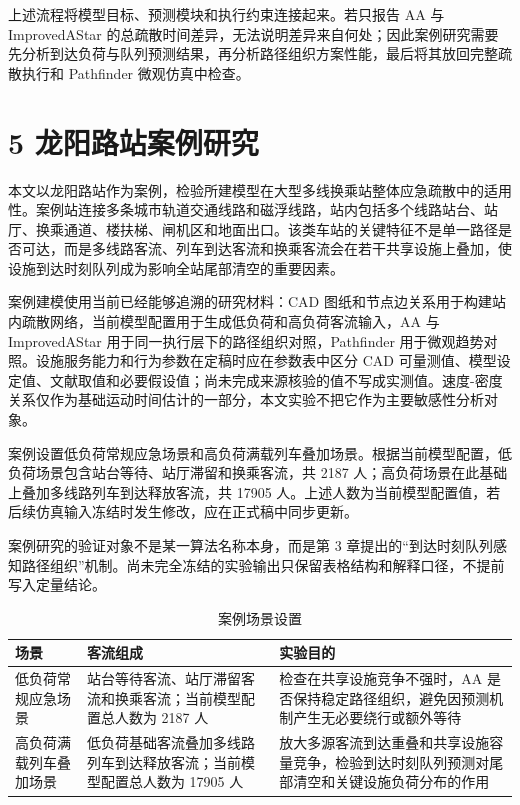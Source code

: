 \documentclass[UTF8,a4paper,12pt]{ctexart}
\begin{document}
上述流程将模型目标、预测模块和执行约束连接起来。若只报告 AA 与 ImprovedAStar 的总疏散时间差异，无法说明差异来自何处；因此案例研究需要先分析到达负荷与队列预测结果，再分析路径组织方案性能，最后将其放回完整疏散执行和 Pathfinder 微观仿真中检查。

\section{5 龙阳路站案例研究}

本文以龙阳路站作为案例，检验所建模型在大型多线换乘站整体应急疏散中的适用性。案例站连接多条城市轨道交通线路和磁浮线路，站内包括多个线路站台、站厅、换乘通道、楼扶梯、闸机区和地面出口。该类车站的关键特征不是单一路径是否可达，而是多线路客流、列车到达客流和换乘客流会在若干共享设施上叠加，使设施到达时刻队列成为影响全站尾部清空的重要因素。

案例建模使用当前已经能够追溯的研究材料：CAD 图纸和节点边关系用于构建站内疏散网络，当前模型配置用于生成低负荷和高负荷客流输入，AA 与 ImprovedAStar 用于同一执行层下的路径组织对照，Pathfinder 用于微观趋势对照。设施服务能力和行为参数在定稿时应在参数表中区分 CAD 可量测值、模型设定值、文献取值和必要假设值；尚未完成来源核验的值不写成实测值。速度-密度关系仅作为基础运动时间估计的一部分，本文实验不把它作为主要敏感性分析对象。

案例设置低负荷常规应急场景和高负荷满载列车叠加场景。根据当前模型配置，低负荷场景包含站台等待、站厅滞留和换乘客流，共 2187 人；高负荷场景在此基础上叠加多线路列车到达释放客流，共 17905 人。上述人数为当前模型配置值，若后续仿真输入冻结时发生修改，应在正式稿中同步更新。

案例研究的验证对象不是某一算法名称本身，而是第 3 章提出的“到达时刻队列感知路径组织”机制。尚未完全冻结的实验输出只保留表格结构和解释口径，不提前写入定量结论。

\begin{table}[htbp]
\centering
\caption{案例场景设置}
\small
\begin{tabular}{p{}p{}p{}}
\toprule
场景 & 客流组成 & 实验目的 \\
\midrule
低负荷常规应急场景 & 站台等待客流、站厅滞留客流和换乘客流；当前模型配置总人数为 2187 人 & 检查在共享设施竞争不强时，AA 是否保持稳定路径组织，避免因预测机制产生无必要绕行或额外等待 \\
高负荷满载列车叠加场景 & 低负荷基础客流叠加多线路列车到达释放客流；当前模型配置总人数为 17905 人 & 放大多源客流到达重叠和共享设施容量竞争，检验到达时刻队列预测对尾部清空和关键设施负荷分布的作用 \\
\bottomrule
\end{tabular}
\end{table}
\end{document}
